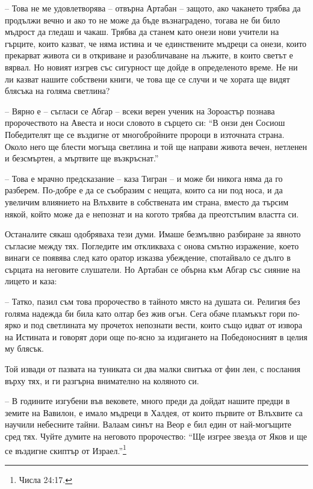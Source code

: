 -- Това не ме удовлетворява -- отвърна Артабан -- защото, ако чакането трябва да
продължи вечно и ако то не може да бъде възнаградено, тогава не би било мъдрост
да гледаш и чакаш. Трябва да станем като онези нови учители на гърците, които
казват, че няма истина и че единствените мъдреци са онези, които прекарват
живота си в откриване и разобличаване на лъжите, в които светът е вярвал. Но
новият изгрев със сигурност ще дойде в определеното време. Не ни ли казват
нашите собствени книги, че това ще се случи и че хората ще видят блясъка на
голяма светлина?

-- Вярно е -- съгласи се Абгар -- всеки верен ученик на Зороастър познава
пророчеството на Авеста и носи словото в сърцето си: ``В онзи ден Сосиош
Победителят ще се въздигне от многобройните пророци в източната страна. Около
него ще блести могъща светлина и той ще направи живота вечен, нетленен и
безсмъртен, а мъртвите ще възкръснат.''

-- Това е мрачно предсказание -- каза Тигран -- и може би никога няма да го
разберем. По-добре е да се съобразим с нещата, които са ни под носа, и да
увеличим влиянието на Влъхвите в собствената им страна, вместо да търсим някой,
който може да е непознат и на когото трябва да преотстъпим властта си.

Останалите сякаш одобряваха тези думи. Имаше безмълвно разбиране за явното
съгласие между тях. Погледите им откликваха с онова смътно изражение, което
винаги се появява след като оратор изказва убеждение, спотайвало се дълго в
сърцата на неговите слушатели. Но Артабан се обърна към Абгар със сияние на
лицето и каза:

-- Татко, пазил съм това пророчество в тайното място на душата си. Религия без
голяма надежда би била като олтар без жив огън. Сега обаче пламъкът гори по-ярко
и под светлината му прочетох непознати вести, които също идват от извора на
Истината и говорят дори още по-ясно за издигането на Победоносният в целия му
блясък.

Той извади от пазвата на туниката си два малки свитъка от фин лен, с послания
върху тях, и ги разгърна внимателно на коляното си.

-- В годините изгубени във вековете, много преди да дойдат нашите предци в
земите на Вавилон, е имало мъдреци в Халдея, от които първите от Влъхвите са
научили небесните тайни. Валаам синът на Веор е бил един от най-могъщите сред
тях. Чуйте думите на неговото пророчество: ``Ще изгрее звезда от Яков и ще се
въздигне скиптър от Израел.''\footnote{Числа 24:17.}


